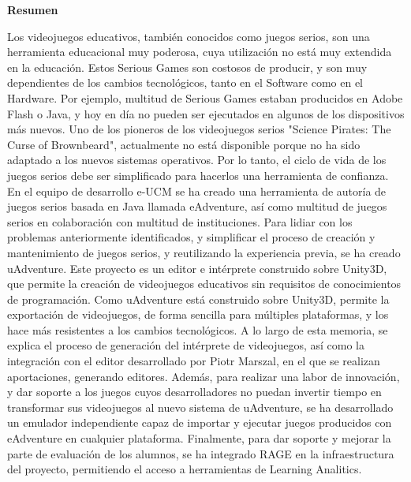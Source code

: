 
\newpage

\thispagestyle{empty}

\begin{center}

{\bf \Huge Resumen}

  \end{center}
\vspace{1cm}

Los videojuegos educativos, también conocidos como juegos serios, son una herramienta educacional muy poderosa, cuya utilización no está muy extendida en la educación. Estos Serious Games son costosos de producir, y son muy dependientes de los cambios tecnológicos, tanto en el Software como en el Hardware. Por ejemplo, multitud de Serious Games estaban producidos en Adobe Flash o Java, y hoy en día no pueden ser ejecutados en algunos de los dispositivos más nuevos. Uno de los pioneros de los videojuegos serios "Science Pirates: The Curse of Brownbeard", actualmente no está disponible porque no ha sido adaptado a los nuevos sistemas operativos. Por lo tanto, el ciclo de vida de los juegos serios debe ser simplificado para hacerlos una herramienta de confianza. En el equipo de desarrollo e-UCM se ha creado una herramienta de autoría de juegos serios basada en Java llamada eAdventure, así como multitud de juegos serios en colaboración con multitud de instituciones. Para lidiar con los problemas anteriormente identificados, y simplificar el proceso de creación y mantenimiento de juegos serios, y reutilizando la experiencia previa, se ha creado uAdventure. Este proyecto es un editor e intérprete construido sobre Unity3D, que permite la creación de videojuegos educativos sin requisitos de conocimientos de programación. Como uAdventure está construido sobre Unity3D, permite la exportación de videojuegos, de forma sencilla para múltiples plataformas, y los hace más resistentes a los cambios tecnológicos.
A lo largo de esta memoria, se explica el proceso de generación del intérprete de videojuegos, así como la integración con el editor desarrollado por Piotr Marszal, en el que se realizan aportaciones, generando editores. Además, para realizar una labor de innovación, y dar soporte a los juegos cuyos desarrolladores no puedan invertir tiempo en transformar sus videojuegos al nuevo sistema de uAdventure, se ha desarrollado un emulador independiente capaz de importar y ejecutar juegos producidos con eAdventure en cualquier plataforma. Finalmente, para dar soporte y mejorar la parte de evaluación de los alumnos, se ha integrado RAGE en la infraestructura del proyecto, permitiendo el acceso a herramientas de Learning Analitics.

